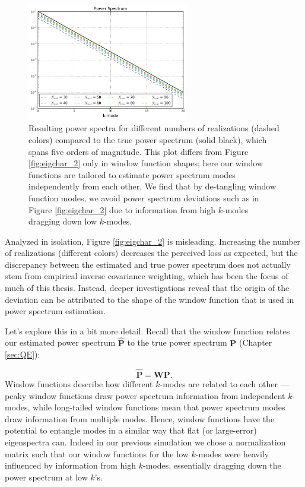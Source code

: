 \begin{figure}
    \centering
	\includegraphics[width=0.63\textwidth]{plots/eigchar_4.png}    
	\caption{Resulting power spectra for different numbers of realizations (dashed colors) compared to the true power spectrum (solid black), which spans five orders of magnitude. This plot differs from Figure \ref{fig:eigchar_2} only in window function shapes; here our window functions are tailored to estimate power spectrum modes independently from each other. We find that by de-tangling window function modes, we avoid power spectrum deviations such as in Figure \ref{fig:eigchar_2} due to information from high $k$-modes dragging down low $k$-modes.}
    \label{fig:eigchar_4}
\end{figure}

Analyzed in isolation, Figure \ref{fig:eigchar_2} is misleading. Increasing the number of realizations (different colors) decreases the perceived loss as expected, but the discrepancy between the estimated and true power spectrum does not actually stem from empirical inverse covariance weighting, which has been the focus of much of this thesis. Instead, deeper investigations reveal that the origin of the deviation can be attributed to the shape of the window function that is used in power spectrum estimation. 

Let's explore this in a bit more detail. Recall that the window function relates our estimated power spectrum $\widehat{\textbf{P}}$ to the true power spectrum $\textbf{P}$ (Chapter \ref{sec:QE}):

\begin{equation}
\widehat{\textbf{P}} = \textbf{W}\textbf{P}.
\end{equation}
Window functions describe how different $k$-modes are related to each other --- peaky window functions draw power spectrum information from independent $k$-modes, while long-tailed window functions mean that power spectrum modes draw information from multiple modes. Hence, window functions have the potential to entangle modes in a similar way that flat (or large-error) eigenspectra can. Indeed in our previous simulation we chose a normalization matrix such that our window functions for the low $k$-modes were heavily influenced by information from high $k$-modes, essentially dragging down the power spectrum at low $k$'s.

